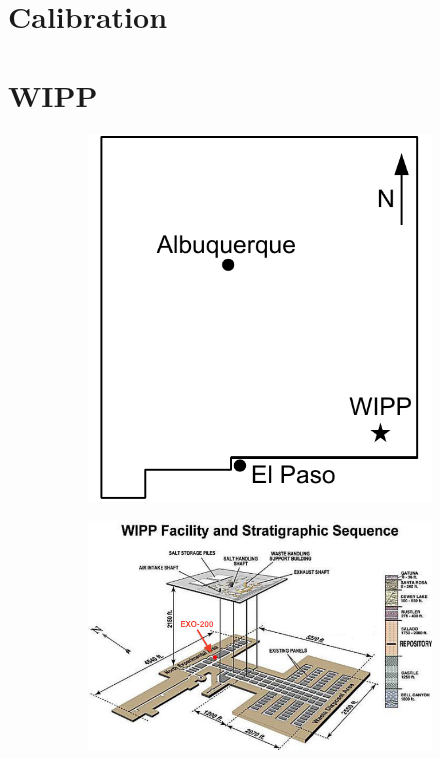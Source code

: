 \documentclass[herrin-thesis.tex]{subfiles}
\begin{document}
\section{Calibration}

\section{WIPP}

\begin{figure}[htb]
\centering
\begin{subfigure}[b]{0.30\linewidth}
\includegraphics[width=\textwidth]{./figures/wipp_map.pdf}
\end{subfigure}\hspace{0.05\linewidth}%
\begin{subfigure}[b]{0.60\linewidth}
\includegraphics[width=\textwidth]{./photos/wipp_site_annotated.png}

\end{subfigure}
\end{figure}
\end{document}

